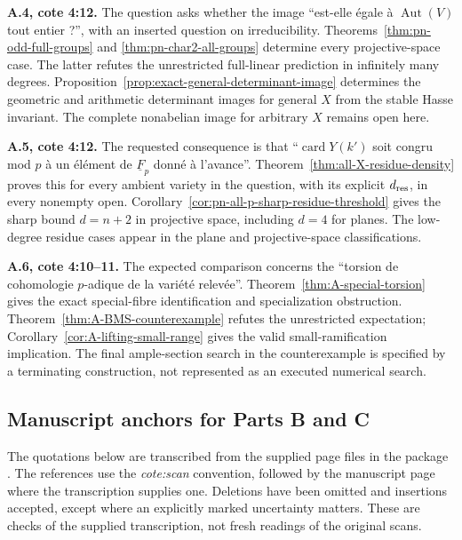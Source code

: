 \par\smallskip\noindent\textbf{A.4, cote 4:12.}
The question asks whether the image ``est-elle égale à
$\operatorname{Aut}(V)$ tout entier ?'', with an inserted question on
irreducibility.  Theorems~\ref{thm:pn-odd-full-groups} and
\ref{thm:pn-char2-all-groups} determine every projective-space case.
The latter refutes the unrestricted full-linear prediction in infinitely
many degrees.  Proposition~\ref{prop:exact-general-determinant-image}
determines the geometric and arithmetic determinant images for general
$X$ from the stable Hasse invariant.  The complete nonabelian image for
arbitrary $X$ remains open here.

\par\smallskip\noindent\textbf{A.5, cote 4:12.}
The requested consequence is that ``$\operatorname{card}Y(k')$ soit
congru mod $p$ à un élément de $\underline F_p$ donné à l'avance''.
Theorem~\ref{thm:all-X-residue-density} proves this for every ambient
variety in the question, with its explicit $d_{\rm res}$, in every
nonempty open.  Corollary~\ref{cor:pn-all-p-sharp-residue-threshold}
gives the sharp bound $d=n+2$ in projective space, including $d=4$
for planes.  The low-degree residue cases appear in the plane and
projective-space classifications.

\par\smallskip\noindent\textbf{A.6, cote 4:10--11.}
The expected comparison concerns the ``torsion de cohomologie
$p$-adique de la variété relevée''.
Theorem~\ref{thm:A-special-torsion} gives the exact special-fibre
identification and specialization obstruction.
Theorem~\ref{thm:A-BMS-counterexample} refutes the unrestricted
expectation; Corollary~\ref{cor:A-lifting-small-range} gives the
valid small-ramification implication.  The final ample-section search
in the counterexample is specified by a terminating construction,
not represented as an executed numerical search.

\subsection{Manuscript anchors for Parts B and C}

The quotations below are transcribed from the supplied page files in
the package . The references use the
\emph{cote:scan} convention, followed by the manuscript page where
the transcription supplies one. Deletions have been omitted and
insertions accepted, except where an explicitly marked uncertainty
matters. These are checks of the supplied transcription, not fresh
readings of the original scans.

